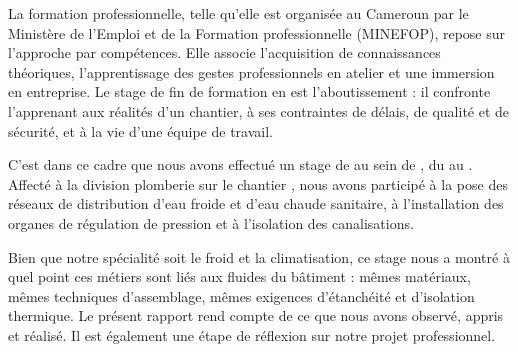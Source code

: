 
La formation professionnelle, telle qu'elle est organisée au Cameroun par le Ministère de
l'Emploi et de la Formation professionnelle (MINEFOP), repose sur l'approche par compétences.
Elle associe l'acquisition de connaissances théoriques, l'apprentissage des gestes
professionnels en atelier et une immersion en entreprise. Le stage de fin de formation en est
l'aboutissement : il confronte l'apprenant aux réalités d'un chantier, à ses contraintes de
délais, de qualité et de sécurité, et à la vie d'une équipe de travail.

C'est dans ce cadre que nous avons effectué un stage de \InfoDuree{} au sein de
\InfoEntreprise, du \InfoDateDebut{} au \InfoDateFin. Affecté à la division plomberie sur le
chantier \InfoChantier, nous avons participé à la pose des réseaux de distribution d'eau froide
et d'eau chaude sanitaire, à l'installation des organes de régulation de pression et à
l'isolation des canalisations.

Bien que notre spécialité soit le froid et la climatisation, ce stage nous a montré à quel
point ces métiers sont liés aux fluides du bâtiment : mêmes matériaux, mêmes techniques
d'assemblage, mêmes exigences d'étanchéité et d'isolation thermique. Le présent rapport rend
compte de ce que nous avons observé, appris et réalisé. Il est également une étape de
réflexion sur notre projet professionnel.
